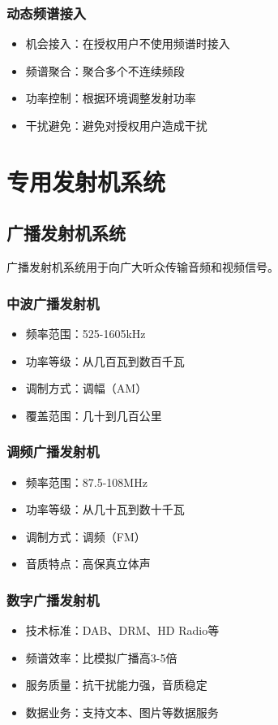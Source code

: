 \documentclass[12pt,UTF8]{ctexbook}
\begin{document}
\subsection{动态频谱接入}
\begin{itemize}[leftmargin=3.5em]
    \item 机会接入：在授权用户不使用频谱时接入
    \item 频谱聚合：聚合多个不连续频段
    \item 功率控制：根据环境调整发射功率
    \item 干扰避免：避免对授权用户造成干扰
\end{itemize}

\chapter{专用发射机系统}

\section{广播发射机系统}

广播发射机系统用于向广大听众传输音频和视频信号。

\subsection{中波广播发射机}
\begin{itemize}[leftmargin=3.5em]
    \item 频率范围：525-1605kHz
    \item 功率等级：从几百瓦到数百千瓦
    \item 调制方式：调幅（AM）
    \item 覆盖范围：几十到几百公里
\end{itemize}

\subsection{调频广播发射机}
\begin{itemize}[leftmargin=3.5em]
    \item 频率范围：87.5-108MHz
    \item 功率等级：从几十瓦到数十千瓦
    \item 调制方式：调频（FM）
    \item 音质特点：高保真立体声
\end{itemize}

\subsection{数字广播发射机}
\begin{itemize}[leftmargin=3.5em]
    \item 技术标准：DAB、DRM、HD Radio等
    \item 频谱效率：比模拟广播高3-5倍
    \item 服务质量：抗干扰能力强，音质稳定
    \item 数据业务：支持文本、图片等数据服务
\end{itemize}
\end{document}
